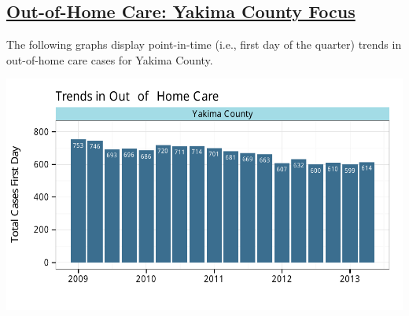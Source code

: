 \documentclass{article}\usepackage[]{graphicx}\usepackage[]{color}
\makeatletter
\def\maxwidth{ %
  \ifdim\Gin@nat@width>\linewidth
    \linewidth
  \else
    \Gin@nat@width
  \fi
}
\newenvironment{knitrout}{}{} %
\makeatother
\begin{document}
\begin{minipage}{\textwidth}
\subsection{\href{http://www.partnersforourchildren.org/child-well-being/visualizations/out-home-care/trends}
 {Out-of-Home Care: Yakima County Focus}
}
The following graphs display point-in-time (i.e., first day of the quarter) trends in out-of-home care cases for
Yakima County.\\[1pt]
\begin{knitrout}
\color{fgcolor}

{\centering \includegraphics[width=\maxwidth]{figure/ooh_focus} 

}



\end{knitrout}

\end{minipage}
\end{document}
